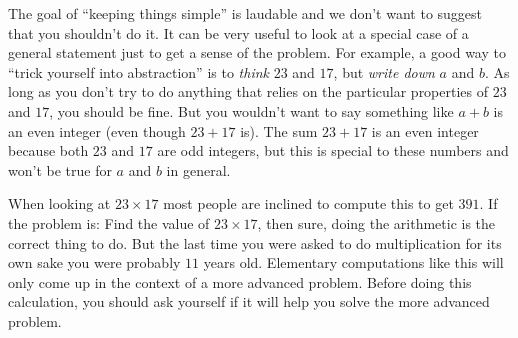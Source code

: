   
  The goal of ``keeping things simple'' is laudable and we don't want
  to suggest that you shouldn't do it.  It can be very useful to look
  at a special case of a general statement just to get a sense of the
  problem. For example, a good way to ``trick yourself into
  abstraction'' is to \emph{think} $23$ and $17$, but \emph{write
    down} $a$ and $b$.  As long as you don’t try to do anything that
  relies on the particular properties of $23$ and $17$, you should be
  fine. But you wouldn’t want to say something like $a+b$ is an even
  integer (even though $23+17$ is). The sum $23+17$ is an even integer
  because both $23$ and $17$ are odd integers, but this is special to
  these numbers and won't be true for $a$ and $b$ in general.


 
    When looking at $23\times17$ most people are inclined to compute
    this to get $391$. If the problem is: Find the value of
    $23\times17$, then sure, doing the arithmetic is the correct thing
    to do. But the last time you were asked to do multiplication for
    its own sake you were probably $11$ years old. Elementary
    computations like this will only come up in the context of a
    more advanced problem.  Before doing this calculation, you should
    ask yourself if it will help you solve the more advanced problem.

